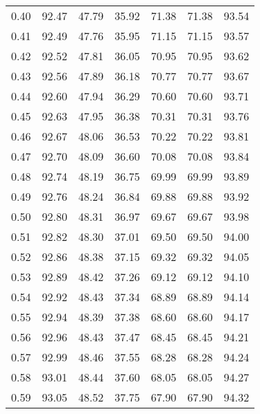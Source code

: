 \begin{tabular}{|c|c|c|c|c|c|c|}
      0.40 &     92.47 &     47.79 &      35.92 &   71.38 &      71.38 &         93.54 \\
      0.41 &     92.49 &     47.76 &      35.95 &   71.15 &      71.15 &         93.57 \\
      0.42 &     92.52 &     47.81 &      36.05 &   70.95 &      70.95 &         93.62 \\
      0.43 &     92.56 &     47.89 &      36.18 &   70.77 &      70.77 &         93.67 \\
      0.44 &     92.60 &     47.94 &      36.29 &   70.60 &      70.60 &         93.71 \\
      0.45 &     92.63 &     47.95 &      36.38 &   70.31 &      70.31 &         93.76 \\
      0.46 &     92.67 &     48.06 &      36.53 &   70.22 &      70.22 &         93.81 \\
      0.47 &     92.70 &     48.09 &      36.60 &   70.08 &      70.08 &         93.84 \\
      0.48 &     92.74 &     48.19 &      36.75 &   69.99 &      69.99 &         93.89 \\
      0.49 &     92.76 &     48.24 &      36.84 &   69.88 &      69.88 &         93.92 \\
      0.50 &     92.80 &     48.31 &      36.97 &   69.67 &      69.67 &         93.98 \\
      0.51 &     92.82 &     48.30 &      37.01 &   69.50 &      69.50 &         94.00 \\
      0.52 &     92.86 &     48.38 &      37.15 &   69.32 &      69.32 &         94.05 \\
      0.53 &     92.89 &     48.42 &      37.26 &   69.12 &      69.12 &         94.10 \\
      0.54 &     92.92 &     48.43 &      37.34 &   68.89 &      68.89 &         94.14 \\
      0.55 &     92.94 &     48.39 &      37.38 &   68.60 &      68.60 &         94.17 \\
      0.56 &     92.96 &     48.43 &      37.47 &   68.45 &      68.45 &         94.21 \\
      0.57 &     92.99 &     48.46 &      37.55 &   68.28 &      68.28 &         94.24 \\
      0.58 &     93.01 &     48.44 &      37.60 &   68.05 &      68.05 &         94.27 \\
      0.59 &     93.05 &     48.52 &      37.75 &   67.90 &      67.90 &         94.32 \\

\end{tabular}
